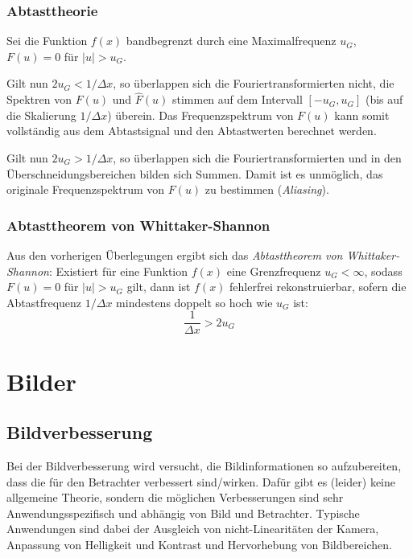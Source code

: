		\subsection{Abtasttheorie}
			Sei die Funktion \( f(x) \) bandbegrenzt durch eine Maximalfrequenz \( u_G \), \dh \( F(u) = 0 \) für \( \lvert u \rvert > u_G \).

			Gilt nun \( 2u_G < 1 / \Delta x \), so überlappen sich die Fouriertransformierten nicht, \dh die Spektren von \( F(u) \) und \( \hat{F}(u) \) stimmen auf dem Intervall \( [-u_G, u_G] \) (bis auf die Skalierung \( 1 / \Delta x \)) überein. Das Frequenzspektrum von \( F(u) \) kann somit vollständig aus dem Abtastsignal und den Abtastwerten berechnet werden.

			Gilt nun \( 2u_G > 1 / \Delta x \), so überlappen sich die Fouriertransformierten und in den Überschneidungsbereichen bilden sich Summen. Damit ist es unmöglich, das originale Frequenzspektrum von \( F(u) \) zu bestimmen (\emph{Aliasing}).

		\subsection{Abtasttheorem von Whittaker-Shannon}
			Aus den vorherigen Überlegungen ergibt sich das \emph{Abtasttheorem von Whittaker-Shannon}: Existiert für eine Funktion \( f(x) \) eine Grenzfrequenz \( u_G < \infty \), sodass \( F(u) = 0 \) für \( \lvert u \rvert > u_G \) gilt, dann ist \( f(x) \) fehlerfrei rekonstruierbar, sofern die Abtastfrequenz \( 1 / \Delta x \) mindestens doppelt so hoch wie \( u_G \) ist:
			\begin{equation*}
				\frac{1}{\Delta x} > 2 u_G
			\end{equation*}

\chapter{Bilder}
\section{Bildverbesserung}
	Bei der Bildverbesserung wird versucht, die Bildinformationen so aufzubereiten, dass die für den Betrachter verbessert sind/wirken. Dafür gibt es (leider) keine allgemeine Theorie, sondern die möglichen Verbesserungen sind sehr Anwendungsspezifisch und abhängig von Bild und Betrachter. Typische Anwendungen sind dabei der Ausgleich von nicht-Linearitäten der Kamera, Anpassung von Helligkeit und Kontrast und Hervorhebung von Bildbereichen.

